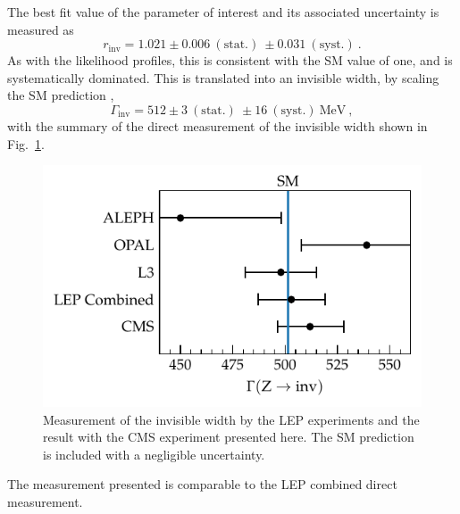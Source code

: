 The best fit value of the parameter of interest and its associated uncertainty is measured as
%
\begin{equation}
    r_{\mathrm{inv}} = 1.021\pm 0.006\ (\mathrm{stat.})\ \pm 0.031\ (\mathrm{syst.})\ .
\end{equation}
%
As with the likelihood profiles, this is consistent with the SM value of one, and is systematically dominated. This is translated into an invisible width, by scaling the SM prediction \cite{PhysRevD.98.030001},
%
\begin{equation}
    \Gamma_{\mathrm{inv}} = 512 \pm 3\ (\mathrm{stat.})\ \pm 16\ (\mathrm{syst.})\ \mathrm{MeV}\ ,
\end{equation}
%
with the summary of the direct measurement of the invisible width shown in Fig.~\ref{fig:finalfit-zinv}.
%
\begin{figure}
    \centering
    \includegraphics{chapters/043_results/images/finalfit-zinv.pdf}
    \caption[Summary of the invisible width measurements.]{
        Measurement of the \PZ invisible width by the LEP experiments and the result with the CMS experiment presented here. The SM prediction is included with a negligible uncertainty.
    }
    \label{fig:finalfit-zinv}
\end{figure}
%
The measurement presented is comparable to the LEP combined direct measurement.